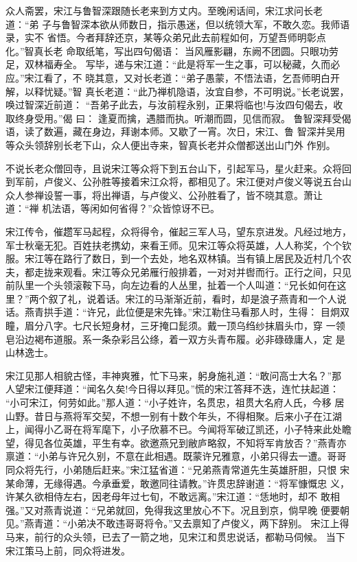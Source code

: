 众人斋罢，宋江与鲁智深跟随长老来到方丈内。至晚闲话间，宋江求问长老道：“弟
子与鲁智深本欲从师数日，指示愚迷，但以统领大军，不敢久恋。我师语录，实不
省悟。今者拜辞还京，某等众弟兄此去前程如何，万望吾师明彰点化。”智真长老
命取纸笔，写出四句偈语：
当风雁影翩，东阙不团圆。只眼功劳足，双林福寿全。
写毕，递与宋江道：“此是将军一生之事，可以秘藏，久而必应。”宋江看了，不
晓其意，又对长老道：“弟子愚蒙，不悟法语，乞吾师明白开解，以释忧疑。”智
真长老道：“此乃禅机隐语，汝宜自参，不可明说。”长老说罢，唤过智深近前道：
“吾弟子此去，与汝前程永别，正果将临也!与汝四句偈去，收取终身受用。”偈
曰：
逢夏而擒，遇腊而执。听潮而圆，见信而寂。
鲁智深拜受偈语，读了数遍，藏在身边，拜谢本师。又歇了一宵。次日，宋江、鲁
智深并吴用等众头领辞别长老下山，众人便出寺来，智真长老并众僧都送出山门外
作别。

不说长老众僧回寺，且说宋江等众将下到五台山下，引起军马，星火赶来。众将回
到军前，卢俊义、公孙胜等接着宋江众将，都相见了。宋江便对卢俊义等说五台山
众人参禅设誓一事，将出禅语，与卢俊义、公孙胜看了，皆不晓其意。萧让道：“禅
机法语，等闲如何省得？”众皆惊讶不已。

宋江传令，催趱军马起程，众将得令，催起三军人马，望东京进发。凡经过地方，
军士秋毫无犯。百姓扶老携幼，来看王师。见宋江等众将英雄，人人称奖，个个钦
服。宋江等在路行了数日，到一个去处，地名双林镇。当有镇上居民及近村几个农
夫，都走拢来观看。宋江等众兄弟雁行般排着，一对对并辔而行。正行之间，只见
前队里一个头领滚鞍下马，向左边看的人丛里，扯着一个人叫道：“兄长如何在这
里？”两个叙了礼，说着话。宋江的马渐渐近前，看时，却是浪子燕青和一个人说
话。燕青拱手道：“许兄，此位便是宋先锋。”宋江勒住马看那人时，生得：
目炯双瞳，眉分八字。七尺长短身材，三牙掩口髭须。戴一顶乌绉纱抹眉头巾，穿
一领皂沿边褐布道服。系一条杂彩吕公绦，着一双方头青布履。必非碌碌庸人，定
是山林逸士。

宋江见那人相貌古怪，丰神爽雅，忙下马来，躬身施礼道：“敢问高士大名？”那
人望宋江便拜道：“闻名久矣!今日得以拜见。”慌的宋江答拜不迭，连忙扶起道：
“小可宋江，何劳如此。”那人道：“小子姓许，名贯忠，祖贯大名府人氏，今移
居山野。昔日与燕将军交契，不想一别有十数个年头，不得相聚。后来小子在江湖
上，闻得小乙哥在将军麾下，小子欣慕不已。今闻将军破辽凯还，小子特来此处瞻
望，得见各位英雄，平生有幸。欲邀燕兄到敝庐略叙，不知将军肯放否？”燕青亦
禀道：“小弟与许兄久别，不意在此相遇。既蒙许兄雅意，小弟只得去一遭。哥哥
同众将先行，小弟随后赶来。”宋江猛省道：“兄弟燕青常道先生英雄肝胆，只恨
宋某命薄，无缘得遇。今承垂爱，敢邀同往请教。”许贯忠辞谢道：“将军慷慨忠
义，许某久欲相侍左右，因老母年过七旬，不敢远离。”宋江道：“恁地时，却不
敢相强。”又对燕青说道：“兄弟就回，免得我这里放心不下。况且到京，倘早晚
便要朝见。”燕青道：“小弟决不敢违哥哥将令。”又去禀知了卢俊义，两下辞别。
宋江上得马来，前行的众头领，已去了一箭之地，见宋江和贯忠说话，都勒马伺候。
当下宋江策马上前，同众将进发。

